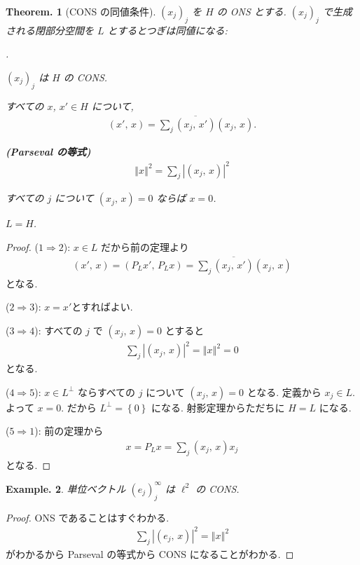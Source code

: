 \documentclass[openany, a4paper, oneside]{jsbook}
\newcounter{enum2}
\renewenvironment{enumerate}{%
\begin{list}%
{%
\arabic{enum2}.\ \,%
}%
{%
\usecounter{enum2}
\setlength{\itemindent}{0pt}%
\setlength{\leftmargin}{15pt}%
\setlength{\rightmargin}{0pt}%
\setlength{\labelsep}{0pt}%
\setlength{\labelwidth}{6pt}%
\setlength{\itemsep}{0pt}%
\setlength{\parsep}{0pt}%
\setlength{\listparindent}{0pt}%
}
}{%
\end{list}%
}
\theoremstyle{break}
\newtheorem{thm}{Theorem.}[section]
\theoremstyle{breakdefn}
\newtheorem{ex}[thm]{Example.}
\newcommand{\abs}[1]{\left|#1\right|}
\newcommand{\norm}[1]{\left\Vert#1\right\Vert}
\newcommand{\cbk}[1]{\left\{#1\right\}}
\newcommand{\rbkt}[2]{\left ( #1,\,#2 \right)}
\newcommand{\upbf}[1]{\textup{\textbf{#1}}}
\begin{document}
\begin{thm}[CONS の同値条件]
 $(x_j)_j$  を $H$ の ONS とする.
 $(x_j)_j$ で生成される閉部分空間を $L$ とするとつぎは同値になる:
\begin{enumerate}
\item $(x_j)_j$ は $H$ の CONS.
\item すべての $x$, $x' \in H$ について,
    \begin{align}
     \rbkt{x'}{x}
     =
     \sum_j \overline{\rbkt{x_j}{x'}} \rbkt{x_j}{x}.
    \end{align}
\item \upbf{(Parseval の等式)}
    \begin{align}
     \norm{x}^2
     =
     \sum_j \abs{\rbkt{x_j}{x}}^2
    \end{align}
\item すべての $j$ について $\rbkt{x_j}{x} = 0$ ならば $x=0$.
\item $L=H$.
\end{enumerate}
\end{thm}
\begin{proof}
(\textbf{$1 \Rightarrow 2$}):
$x \in L$ だから前の定理より
\begin{align}
 \rbkt{x'}{x}
 =
 \rbkt{P_L x'}{P_L x}
 =
 \sum_j \overline{\rbkt{x_j}{x'}} \rbkt{x_j}{x}
\end{align}
となる.

(\textbf{$2 \Rightarrow 3$}):
$x = x'$とすればよい.

(\textbf{$3 \Rightarrow 4$}):
すべての $j$ で $\rbkt{x_j}{x} = 0$ とすると
\begin{align}
 \sum_j \abs{\rbkt{x_j}{x}}^2
 =
 \norm{x}^2
 =
 0
\end{align}
となる.

(\textbf{$4 \Rightarrow 5$}):
$x \in L^{\perp}$ ならすべての $j$ について $\rbkt{x_j}{x} = 0$ となる.
定義から $x_j \in L$.
よって $x=0$.
だから $L^{\perp} = \cbk{0}$ になる.
射影定理からただちに $H=L$ になる.

(\textbf{$5 \Rightarrow 1$}):
前の定理から
\begin{align}
 x
 =
 P_L x
 =
 \sum_j \rbkt{x_j}{x} x_j
\end{align}
となる.
\end{proof}

\begin{ex}
単位ベクトル
$(e_j)_j^{\infty}$ は $\ell^2$ の CONS.
\end{ex}
\begin{proof}
ONS であることはすぐわかる.
\begin{align}
 \sum_j \abs{\rbkt{e_j}{x}}^2
 =
 \norm{x}^2
\end{align}
がわかるから Parseval の等式から CONS になることがわかる.
\end{proof}
\end{document}
